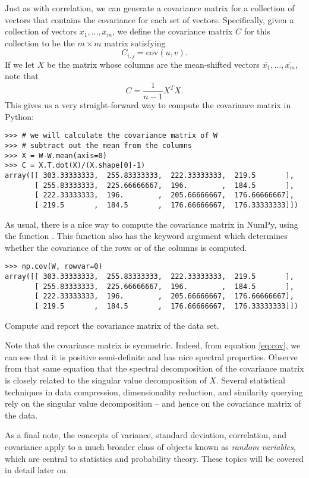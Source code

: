 Just as with correlation, we can generate a covariance matrix for a collection of vectors that contains the covariance for each set of vectors.
Specifically, given a collection of vectors $x_1,\ldots, x_m$, we define the covariance matrix $C$ for this collection to be the $m \times m$ matrix satisfying
\[
C_{i,j} = \text{cov}(u,v).
\]
If we let $X$ be the matrix whose columns are the mean-shifted vectors $\bar{x_1}, \ldots, \bar{x_m}$, note that
\begin{equation}
C = \frac{1}{n-1}X^TX.
\label{eq:cov}
\end{equation}
This gives us a very straight-forward way to compute the covariance matrix in Python:
\begin{lstlisting}
>>> # we will calculate the covariance matrix of W
>>> # subtract out the mean from the columns
>>> X = W-W.mean(axis=0)
>>> C = X.T.dot(X)/(X.shape[0]-1)
array([[ 303.33333333,  255.83333333,  222.33333333,  219.5       ],
       [ 255.83333333,  225.66666667,  196.        ,  184.5       ],
       [ 222.33333333,  196.        ,  205.66666667,  176.66666667],
       [ 219.5       ,  184.5       ,  176.66666667,  176.33333333]])
\end{lstlisting}
As usual, there is a nice way to compute the covariance matrix in NumPy, using the function . This function
also has the keyword argument  which determines whether the covariance of the rows or of the columns is computed.
\begin{lstlisting}
>>> np.cov(W, rowvar=0)
array([[ 303.33333333,  255.83333333,  222.33333333,  219.5       ],
       [ 255.83333333,  225.66666667,  196.        ,  184.5       ],
       [ 222.33333333,  196.        ,  205.66666667,  176.66666667],
       [ 219.5       ,  184.5       ,  176.66666667,  176.33333333]])
\end{lstlisting}

\begin{problem}
Compute and report the covariance matrix of the  data set. 
\end{problem}
Note that the covariance matrix is symmetric. 
Indeed, from equation \ref{eq:cov}, we can see that it is positive semi-definite and has nice spectral properties.
Observe from that same equation that the spectral decomposition of the covariance matrix is closely related to the singular value decomposition of $X$. 
Several statistical techniques in data compression, dimensionality reduction, and similarity querying 
rely on the singular value decomposition -- and hence on the covariance matrix of the data.

As a final note, the concepts of variance, standard deviation, correlation, and covariance apply to a much broader class of objects
known as \emph{random variables}, which are central to statistics and probability theory. These topics will be
covered in detail later on.

